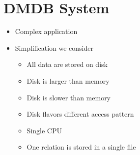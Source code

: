 
\section{DMDB System}
\begin{itemize}
    \item Complex application
    \item Simplification we consider
        \begin{itemize}
            \item All data are stored on disk
            \item Disk is larger than memory
            \item Disk is slower than memory
            \item Disk flavors different access pattern
            \item Single CPU
            \item One relation is stored in a single file
        \end{itemize}
\end{itemize}

